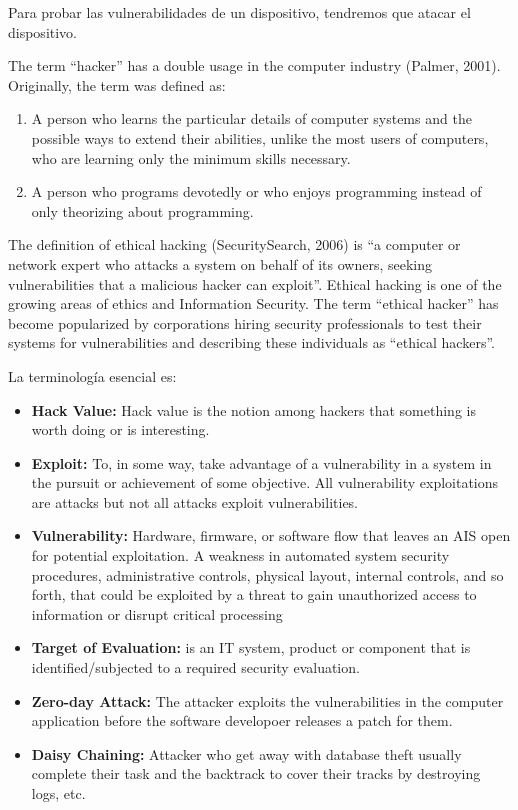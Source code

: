 
Para probar las vulnerabilidades de un dispositivo, tendremos que atacar el dispositivo.

The term ``hacker'' has a double usage in the computer industry (Palmer, 2001). Originally, the term was defined as:  
\begin{enumerate}
	\item A person who learns the particular details of computer systems and the possible ways to extend their abilities, unlike  the  most  users  of  computers,  who  are  learning  only the minimum skills necessary.  
	\item A person who programs devotedly or who enjoys programming instead of only theorizing about programming.
\end{enumerate}

The definition of ethical hacking (SecuritySearch, 2006) is  ``a computer or network expert who attacks a system on behalf of its owners, seeking vulnerabilities that a malicious hacker can exploit''. Ethical hacking is one of the growing areas of ethics and Information Security. The term ``ethical hacker'' has become popularized by corporations hiring security professionals to test their systems for vulnerabilities and describing these individuals as ``ethical hackers''.\cite{ethicalHacking}

La terminología esencial es:

\begin{itemize}
	\item \textbf{Hack Value:} Hack value is the notion among hackers that something is worth doing or is interesting.
	\item \textbf{Exploit:} To, in some way, take advantage of a vulnerability in a system in the pursuit or achievement of some objective. All vulnerability exploitations are attacks but not all attacks exploit vulnerabilities.\cite{Hacking1}
	\item \textbf{Vulnerability:} Hardware, firmware, or software flow that leaves an AIS open for potential exploitation. A weakness in automated system security procedures, administrative controls, physical layout, internal controls, and so forth, that could be exploited by a threat to gain unauthorized access to information or disrupt critical processing
	\item \textbf{Target of Evaluation:} is an IT system, product or component that is identified/subjected to a required security evaluation.
	\item \textbf{Zero-day Attack:} The attacker exploits the vulnerabilities in the computer application before the software developoer releases a patch for them.
	\item \textbf{Daisy Chaining:} Attacker who get away with database theft usually complete their task and the backtrack to cover their tracks by destroying logs, etc.
\end{itemize}

